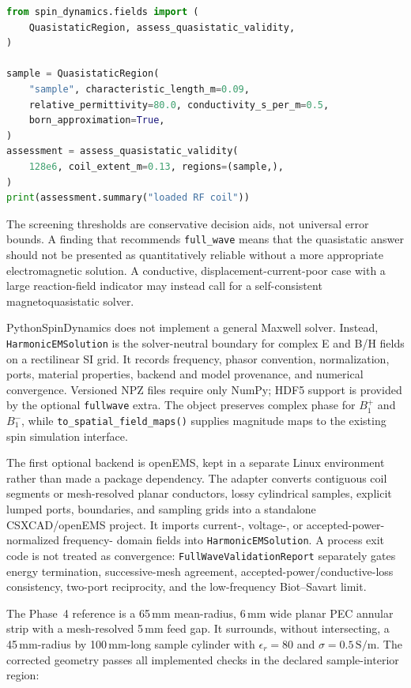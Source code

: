 \documentclass[11pt,oneside]{report}
\newcommand{\code}[1]{\texttt{#1}}
\begin{document}
\begin{lstlisting}[language=Python]
from spin_dynamics.fields import (
    QuasistaticRegion, assess_quasistatic_validity,
)

sample = QuasistaticRegion(
    "sample", characteristic_length_m=0.09,
    relative_permittivity=80.0, conductivity_s_per_m=0.5,
    born_approximation=True,
)
assessment = assess_quasistatic_validity(
    128e6, coil_extent_m=0.13, regions=(sample,),
)
print(assessment.summary("loaded RF coil"))
\end{lstlisting}

The screening thresholds are conservative decision aids, not universal error
bounds. A finding that recommends \code{full\_wave} means that the quasistatic
answer should not be presented as quantitatively reliable without a more
appropriate electromagnetic solution. A conductive, displacement-current-poor
case with a large reaction-field indicator may instead call for a
self-consistent magnetoquasistatic solver.

PythonSpinDynamics does not implement a general Maxwell solver. Instead,
\code{HarmonicEMSolution} is the solver-neutral boundary for complex E and B/H
fields on a rectilinear SI grid. It records frequency, phasor convention,
normalization, ports, material properties, backend and model provenance, and
numerical convergence. Versioned NPZ files require only NumPy; HDF5 support is
provided by the optional \code{fullwave} extra. The object preserves complex
phase for \(B_1^+\) and \(B_1^-\), while
\code{to\_spatial\_field\_maps()} supplies magnitude maps to the existing spin
simulation interface.

The first optional backend is openEMS, kept in a separate Linux environment
rather than made a package dependency. The adapter converts contiguous coil
segments or mesh-resolved planar conductors, lossy cylindrical samples, explicit
lumped ports, boundaries, and sampling grids into a standalone CSXCAD/openEMS
project. It imports current-, voltage-, or accepted-power-normalized frequency-
domain fields into \code{HarmonicEMSolution}. A process exit code is not treated
as convergence: \code{FullWaveValidationReport} separately gates energy
termination, successive-mesh agreement, accepted-power/conductive-loss
consistency, two-port reciprocity, and the low-frequency Biot--Savart limit.

The Phase~4 reference is a 65\,mm mean-radius, 6\,mm wide planar PEC annular
strip with a mesh-resolved 5\,mm feed gap. It surrounds, without intersecting, a
45\,mm-radius by 100\,mm-long sample cylinder with
\(\epsilon_r=80\) and \(\sigma=0.5\,\mathrm{S/m}\). The corrected geometry passes
all implemented checks in the declared sample-interior region:
\end{document}
